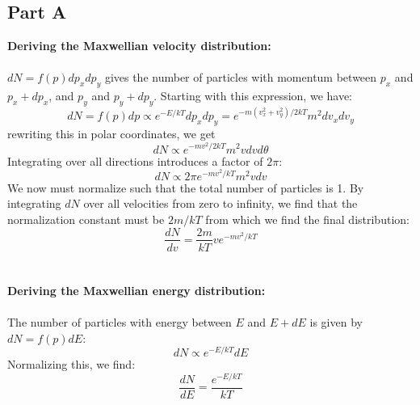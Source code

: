 \documentclass[a4paper, 11pt]{article}
\begin{document}
	\subsection*{Part A}
		\textbf{Deriving the Maxwellian velocity distribution:}
		\ \\ \\
		$dN = f(p)dp_xdp_y$ gives the number of particles with momentum between $p_x$ and $p_x + dp_x$, and 
		$p_y$ and $p_y + dp_y$. 
		Starting with this expression, 
		we have:
		\begin{equation*}
			dN = f(p)dp \propto e^{-E/kT}dp_xdp_y = e^{-m(v_x^2+v_y^2)/2kT}m^2dv_xdv_y
		\end{equation*}
		rewriting this in polar coordinates, we get
		\begin{equation*}
			dN \propto e^{-mv^2/2kT}m^2vdvd\theta
		\end{equation*}
		Integrating over all directions introduces a factor of $2\pi$:
		\begin{equation*}
			dN \propto 2\pi e^{-mv^2/kT}m^2vdv
		\end{equation*}
		We now must normalize such that the total number of particles is 1. By integrating $dN$ over all velocities from 
		zero to infinity, we find that the normalization constant must be $2m/kT$ from which we find the final distribution:
		\begin{equation*}
			\frac{dN}{dv} = \frac{2m}{kT}ve^{-mv^2/kT}
		\end{equation*}
		\ \\ \\
		\textbf{Deriving the Maxwellian energy distribution:}
		\ \\ \\
		The number of particles with energy between $E$ and $E + dE$ is given by $dN = f(p)dE$:
		\begin{equation*}
			dN \propto e^{-E/kT}dE
		\end{equation*}
		Normalizing this, we find:
		\begin{equation*}
			\frac{dN}{dE} = \frac{e^{-E/kT}}{kT}
		\end{equation*}
\end{document}
